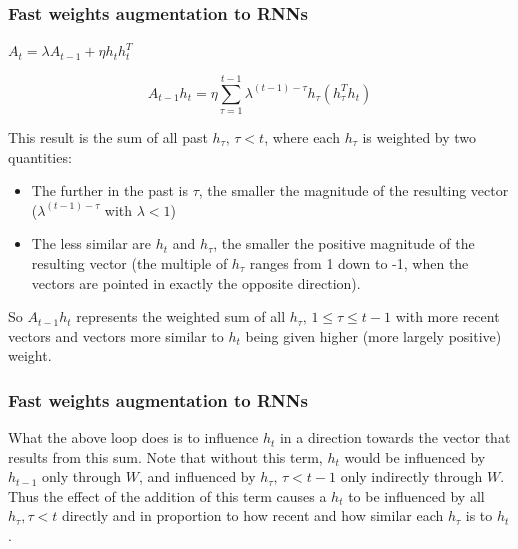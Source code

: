 \documentclass{beamer}
\begin{document}
\begin{frame}
  \frametitle{Fast weights augmentation to RNNs}
    $A_t = \lambda A_{t-1} + \eta h_t h_t^T$

    \begin{equation*}
A_{t-1} h_t = \eta \sum_{\tau=1}^{t-1} \lambda^{(t-1) - \tau} h_\tau \left(h_\tau^T h_t\right)
    \end{equation*}

This result is the sum of all past $h_\tau,\, \tau < t$, where each $h_\tau$ is weighted by two quantities:

\begin{itemize}
\item The further in the past is $\tau$, the smaller the magnitude of the resulting vector ($\lambda^{(t-1) - \tau}$ with $\lambda < 1$)
\item The less similar are $h_t$ and $h_\tau$, the smaller the positive magnitude of the resulting vector (the multiple of $h_\tau$ ranges from 1 down to -1, when the vectors are pointed in exactly the opposite direction).
\end{itemize}
%
So $A_{t-1} h_t$ represents the weighted sum of all $h_\tau,\, 1 \leq \tau \leq t-1$ with more recent vectors and vectors more similar to $h_t$ being given higher (more largely positive) weight.
\end{frame}

\begin{frame}
  \frametitle{Fast weights augmentation to RNNs}
  What the above loop does is to influence $h_t$ in a direction towards the vector that results from this sum. Note that without this term, $h_t$ would be influenced by $h_{t-1}$ only through $W$, and influenced by $h_\tau,\, \tau < t-1$ only indirectly through $W$. Thus the effect of the addition of this term causes a $h_t$ to be influenced by all $h_\tau, \tau < t$ directly and in proportion to how recent and how similar each $h_\tau$ is to $h_t$.
\end{frame}
\end{document}
